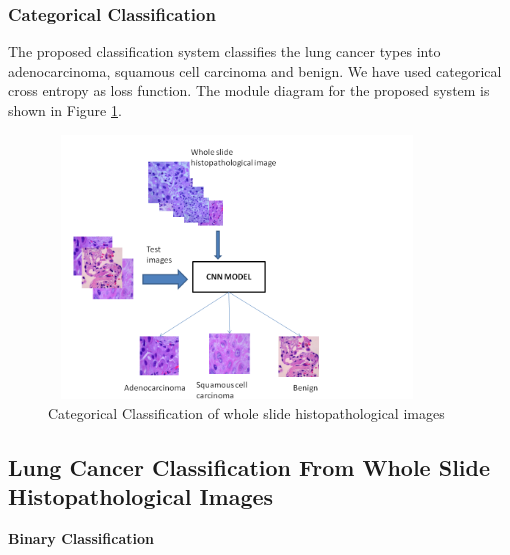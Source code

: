 \documentclass[conference]{IEEEtran}
\begin{document}
\subsubsection{Categorical Classification}
The proposed classification system classifies the lung cancer types into adenocarcinoma, squamous cell carcinoma and benign. We have used categorical cross entropy as loss function. The module diagram for the proposed system is shown in Figure \ref{fig10}.\newline
\begin{figure}[htbp]
\centerline{\includegraphics[width=10cm, height=7cm]{./figures/pic2a.png}}
\caption{Categorical Classification of whole slide histopathological images}
\label{fig10}
\end{figure}

\subsection{Lung Cancer Classification From Whole Slide Histopathological Images}
\newline
\textbf{Binary Classification}
%
\end{document}
